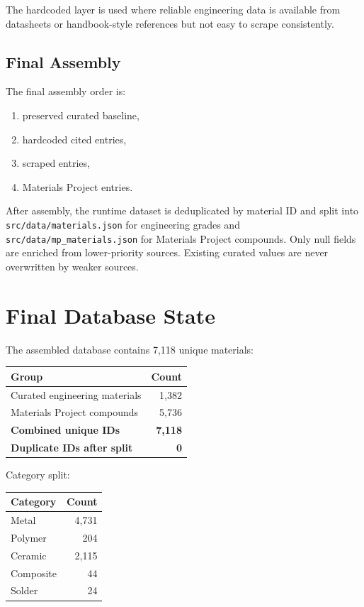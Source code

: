 \documentclass[11pt,a4paper]{article}
\begin{document}
The hardcoded layer is used where reliable engineering data is available from datasheets or handbook-style references but not easy to scrape consistently.

\subsection{Final Assembly}

The final assembly order is:

\begin{enumerate}[leftmargin=*]
  \item preserved curated baseline,
  \item hardcoded cited entries,
  \item scraped entries,
  \item Materials Project entries.
\end{enumerate}

After assembly, the runtime dataset is deduplicated by material ID and split into \texttt{src/data/materials.json} for engineering grades and \texttt{src/data/mp\_materials.json} for Materials Project compounds. Only null fields are enriched from lower-priority sources. Existing curated values are never overwritten by weaker sources.

\section{Final Database State}

The assembled database contains 7,118 unique materials:

\begin{center}
\begin{tabular}{lr}
\toprule
\textbf{Group} & \textbf{Count} \\
\midrule
Curated engineering materials & 1,382 \\
Materials Project compounds & 5,736 \\
\midrule
\textbf{Combined unique IDs} & \textbf{7,118} \\
\midrule
\textbf{Duplicate IDs after split} & \textbf{0} \\
\bottomrule
\end{tabular}
\end{center}

Category split:

\begin{center}
\begin{tabular}{lr}
\toprule
\textbf{Category} & \textbf{Count} \\
\midrule
Metal & 4,731 \\
Polymer & 204 \\
Ceramic & 2,115 \\
Composite & 44 \\
Solder & 24 \\
\bottomrule
\end{tabular}
\end{center}
\end{document}
